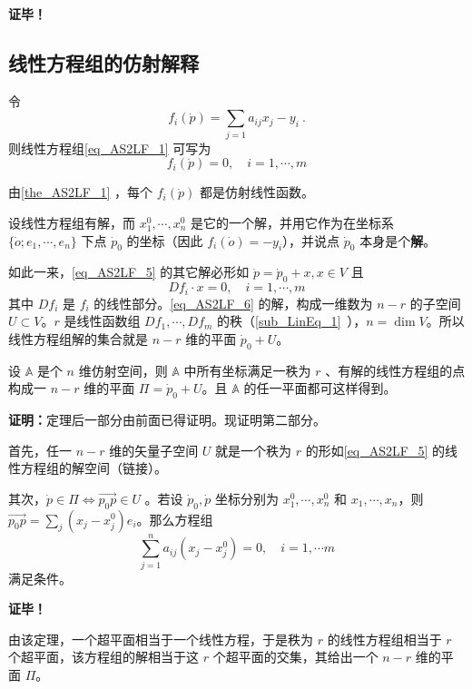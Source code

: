 \textbf{证毕！}
\subsection{线性方程组的仿射解释}
令
\begin{equation}\label{eq_AS2LF_7}
f_i(\dot p)=\sum_{j=1}a_{ij}x_j-y_i~.
\end{equation}
则线性方程组\autoref{eq_AS2LF_1} 可写为
\begin{equation}\label{eq_AS2LF_5}
f_i(\dot p)=0,\quad i=1,\cdots,m
\end{equation}

由\autoref{the_AS2LF_1} ，每个 $f_i(\dot p)$ 都是仿射线性函数。

设线性方程组有解，而 $x_1^0,\cdots,x_n^0$ 是它的一个解，并用它作为在坐标系 $\{\dot o;e_1,\cdots,e_n\}$ 下点 $\dot p_0$ 的坐标（因此 $f_i(\dot o)=-y_i$），并说点 $\dot p_0$ 本身是个\textbf{解}。

如此一来，\autoref{eq_AS2LF_5} 的其它解必形如 $\dot p=\dot p_0+x, x\in V$ 且
\begin{equation}\label{eq_AS2LF_6}
 Df_i \cdot x=0,\quad i=1,\cdots,m
\end{equation}
其中 $Df_i$ 是 $f_i$ 的线性部分。\autoref{eq_AS2LF_6} 的解，构成一维数为 $n-r$ 的子空间 $U\subset V$。$r$ 是线性函数组 $Df_1,\cdots,Df_m$ 的秩（\autoref{sub_LinEq_1}~），$n=\dim V$。所以线性方程组解的集合就是 $n-r$ 维的平面 $\dot p_0+U$。

\begin{theorem}{}
设 $\mathbb A$ 是个 $n$ 维仿射空间，则 $\mathbb A$ 中所有坐标满足一秩为 $r$ 、有解的线性方程组的点构成一 $n-r$ 维的平面 $\Pi=\dot p_0+U$。且 $\mathbb A$ 的任一平面都可这样得到。
\end{theorem}
\textbf{证明：}定理后一部分由前面已得证明。现证明第二部分。

首先，任一 $n-r$ 维的矢量子空间 $U$ 就是一个秩为 $r$ 的形如\autoref{eq_AS2LF_5}  的线性方程组的解空间（链接）。

其次，$\dot p\in\Pi\Leftrightarrow\vec{p_0p}\in U$ 。若设 $\dot p_0,\dot p$ 坐标分别为 $x^0_1,\cdots,x^0_n$ 和 $x_1,\cdots,x_n$，则 $\vec{p_0p}=\sum_{j}(x_j-x^0_j)e_i$。那么方程组
\begin{equation}
\sum_{j=1}^n a_{ij}(x_j-x_j^0)=0,\quad i=1,\cdots m
\end{equation}
 满足条件。

 \textbf{证毕！}

由该定理，一个超平面相当于一个线性方程，于是秩为 $r$ 的线性方程组相当于 $r$ 个超平面，该方程组的解相当于这 $r$ 个超平面的交集，其给出一个 $n-r$ 维的平面 $\Pi$。